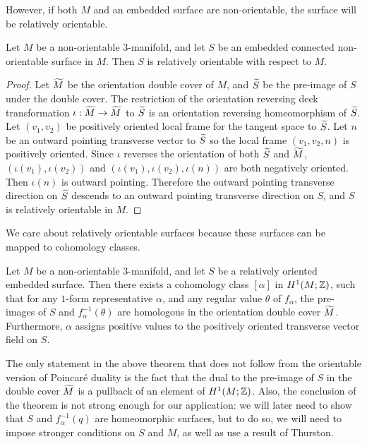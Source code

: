 However, if both $M$ and an embedded surface are non-orientable, the surface will be relatively orientable.
\begin{prop}
  \label{prop:relative-orientability}
  Let $M$ be a non-orientable $3$-manifold, and let $S$ be an embedded connected non-orientable surface in $M$.
  Then $S$ is relatively orientable with respect to $M$.
\end{prop}
\begin{proof}
  Let $\widetilde{M}$ be the orientation double cover of $M$, and $\widetilde{S}$ be the pre-image of $S$ under the double cover.
  The restriction of the orientation reversing deck transformation $\iota:\widetilde{M}\rightarrow\widetilde{M}$ to $\widetilde{S}$ is an orientation reversing homeomorphism of $\widetilde{S}$.
  Let $(v_1, v_2)$ be positively oriented local frame for the tangent space to $\widetilde{S}$.
  Let $n$ be an outward pointing transverse vector to $\widetilde{S}$ so the local frame $(v_1, v_2, n)$ is positively oriented.
  Since $\iota$ reverses the orientation of both $\widetilde{S}$ and $\widetilde{M}$, $(\iota(v_1), \iota(v_2))$ and $(\iota(v_1), \iota(v_2), \iota(n))$ are both negatively oriented.
  Then $\iota(n)$ is outward pointing.
  Therefore the outward pointing transverse direction on $\widetilde{S}$ descends to an outward pointing transverse direction on $S$, and $S$ is relatively orientable in $M$.
\end{proof}

We care about relatively orientable surfaces because these surfaces can be mapped to cohomology classes.
\begin{thm}
  \label{thm:Poincare-duality}
  Let $M$ be a non-orientable $3$-manifold, and let $S$ be a relatively oriented embedded surface.
  Then there exists a cohomology class $[\alpha]$ in $H^1(M; \mathbb{Z})$, such that for any $1$-form representative $\alpha$, and any regular value $\theta$ of $f_{\alpha}$, the pre-images of $S$ and $f_{\alpha}^{-1}(\theta)$ are homologous in the orientation double cover $\widetilde{M}$.
  Furthermore, $\alpha$ assigns positive values to the positively oriented transverse vector field on $S$.
\end{thm}
\begin{rem}
  The only statement in the above theorem that does not follow from the orientable version of Poincar\'e duality is the fact that the dual to the pre-image of $S$ in the double cover $\widetilde{M}$ is a pullback of an element of $H^1(M; \mathbb{Z})$. Also, the conclusion of the theorem is not strong enough for our application: we will later need to show that $S$ and $f_{\alpha}^{-1}(q)$ are homeomorphic surfaces, but to do so, we will need to impose stronger conditions on $S$ and $M$, as well as use a result of Thurston.
\end{rem}

